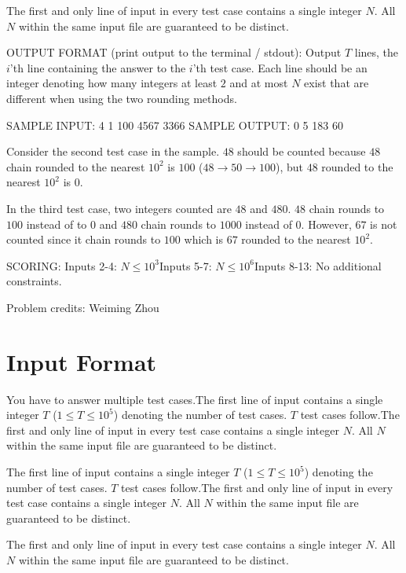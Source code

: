 \documentclass[12pt]{article}
\begin{document}
The first and only line of input in every test case contains a single integer
$N$. All $N$ within the same input file are guaranteed to be distinct.


OUTPUT FORMAT (print output to the terminal / stdout):
Output $T$ lines, the $i$'th line containing the answer to the $i$'th test case.
Each line should be an integer denoting how many integers at least $2$ and at
most $N$ exist that are different when using the two rounding methods.


SAMPLE INPUT:
4
1
100
4567
3366
SAMPLE OUTPUT: 
0
5
183
60

Consider the second test case in the sample. $48$ should be counted because $48$
chain rounded to the nearest $10^2$ is $100$ ($48\to 50\to 100$), but $48$
rounded to the nearest $10^2$ is
$0$.

In the third test case, two integers counted are $48$ and $480$. $48$ chain 
rounds to $100$ instead of to $0$ and $480$ chain rounds to $1000$ instead of
$0$.  However, $67$ is not counted since it chain rounds to $100$ which is $67$
rounded to the nearest $10^2$.

SCORING:
Inputs 2-4: $N\le 10^3$Inputs 5-7: $N\le 10^6$Inputs 8-13: No additional constraints.


Problem credits: Weiming Zhou



\section*{Input Format}
You have to answer multiple test cases.The first line of input contains a single integer $T$ ($1 \leq T \leq 10^5$)
denoting the number of test cases. $T$ test cases follow.The first and only line of input in every test case contains a single integer
$N$. All $N$ within the same input file are guaranteed to be distinct.

The first line of input contains a single integer $T$ ($1 \leq T \leq 10^5$)
denoting the number of test cases. $T$ test cases follow.The first and only line of input in every test case contains a single integer
$N$. All $N$ within the same input file are guaranteed to be distinct.

The first and only line of input in every test case contains a single integer
$N$. All $N$ within the same input file are guaranteed to be distinct.
\end{document}

